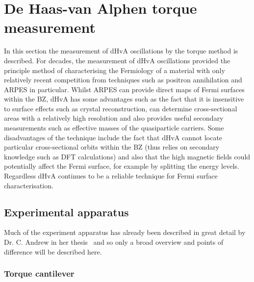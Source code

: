 
\section{De Haas-van Alphen torque measurement}

In this section the measurement of \ac{dHvA} oscillations by the torque method is described. For decades, the measurement of \ac{dHvA} oscillations provided the principle method of characterising the Fermiology of a material with only relatively recent competition from techniques such as positron annihilation and \ac{ARPES} in particular. Whilst \ac{ARPES} can provide direct maps of Fermi surfaces within the \ac{BZ}, \ac{dHvA} has some advantages such as the fact that it is insensitive to surface effects such as crystal reconstruction, can determine cross-sectional areas with a relatively high resolution and also provides useful secondary measurements such as effective masses of the quasiparticle carriers.  Some disadvantages of the technique include the fact that \ac{dHvA} cannot locate particular cross-sectional orbits within the \ac{BZ} (thus relies on secondary knowledge such as \ac{DFT} calculations) and also that the high magnetic fields could potentially affect the Fermi surface, for example by splitting the energy levels. Regardless \ac{dHvA} continues to be a reliable technique for Fermi surface characterisation.

\subsection{Experimental apparatus}

Much of the experiment apparatus has already been described in great detail by Dr. C. Andrew in her thesis~\cite{Andrew2010} and so only a broad overview and points of difference will be described here. 

\subsubsection{Torque cantilever}

